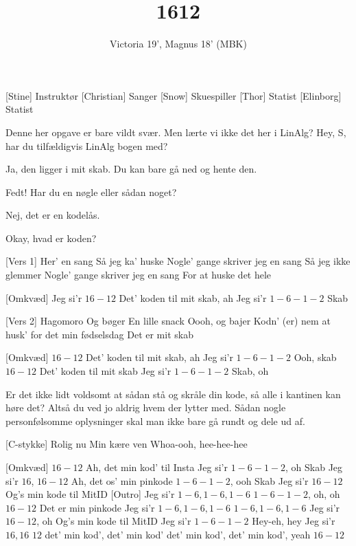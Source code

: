 \documentclass[a4paper,11pt]{article}
\title{1612}
\author{Victoria 19', Magnus 18' (MBK)}
\begin{document}
\maketitle

\begin{roles}
[Stine] Instruktør
[Christian] Sanger
[Snow] Skuespiller
[Thor] Statist
[Elinborg] Statist
\end{roles}

\begin{song}
 Denne her opgave er bare vildt svær. Men lærte vi ikke det her i LinAlg? Hey, S, har du tilfældigvis LinAlg bogen med?

 Ja, den ligger i mit skab. Du kan bare gå ned og hente den. 

 Fedt! Har du en nøgle eller sådan noget?

 Nej, det er en kodelås.

 Okay, hvad er koden?

[Vers 1] Her' en sang
Så jeg ka' huske
Nogle' gange skriver jeg en sang
Så jeg ikke glemmer
Nogle' gange skriver jeg en sang
For at huske det hele

[Omkvæd] Jeg si'r $16-12$
Det' koden til mit skab, ah
Jeg si'r $1-6-1-2$
Skab

[Vers 2] Hagomoro
Og bøger
En lille snack 
Oooh, og bajer 
Kodn' (er) nem at husk' for det min fødselsdag 
Det er mit skab

[Omkvæd] $16-12$
Det' koden til mit skab, ah
Jeg si'r $1-6-1-2$
Ooh, skab
$16-12$
Det' koden til mit skab
Jeg si'r $1-6-1-2$
Skab, oh

 Er det ikke lidt voldsomt at sådan stå og skråle din kode, så alle i kantinen kan høre det? Altså du ved jo aldrig hvem der lytter med. Sådan nogle personfølsomme oplysninger skal man ikke bare gå rundt og dele ud af. 

[C-stykke] Rolig nu
Min kære ven
Whoa-ooh, hee-hee-hee

[Omkvæd] $16-12$
Ah, det min kod' til Insta
Jeg si'r $1-6-1-2$, oh
Skab
Jeg si'r $16$, $16-12$
Ah, det os' min pinkode
$1-6-1-2$, ooh
Skab
Jeg si'r $16-12$
Og's min kode til MitID
[Outro] Jeg si'r $1-6, 1-6, 1-6$
$1-6-1-2$, oh, oh
$16-12$
Det er min pinkode
Jeg si'r $1-6, 1-6, 1-6$
$1-6, 1-6, 1-6$
Jeg si'r $16-12$, oh
Og's min kode til MitID
Jeg si'r $1-6-1-2$
Hey-eh, hey
Jeg si'r $16, 16$
$12$ det' min kod', det' min kod'
det' min kod', det' min kod', yeah
$16-12$
\end{song}
\end{document}
